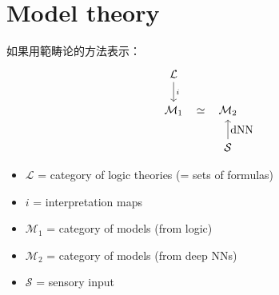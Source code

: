 \documentclass[orivec]{llncs}
\begin{document}

\section{Model theory}

如果用範畴论的方法表示：
\begin{equation}
\begin{tikzcd}[]
\mathcal{L} \arrow[d, "i"] \\
\mathcal{M}_1 \arrow[r, phantom, "\simeq"] & \mathcal{M}_2 \\
& \arrow[u, "\mbox{dNN}" swap] \mathcal{S}
\end{tikzcd}
\end{equation}
\begin{itemize}
\item $\mathcal{L}$ = category of logic theories (= sets of formulas)
\item $i$ = interpretation maps
\item $\mathcal{M}_1$ = category of models (from logic)
\item $\mathcal{M}_2$ = category of models (from deep NNs)
\item $\mathcal{S}$ = sensory input
\end{itemize}
\end{document}
